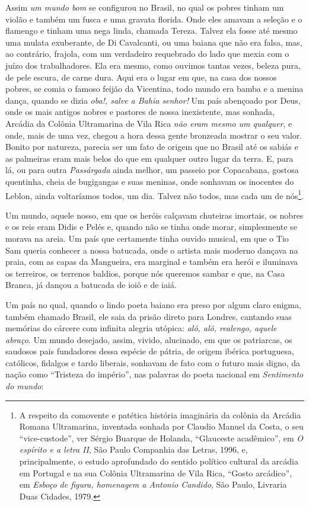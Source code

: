 Assim \emph{um mundo bom} se configurou no Brasil, no qual os pobres
tinham um violão e também um fusca e uma gravata florida. Onde eles
amavam a seleção e o flamengo e tinham uma nega linda, chamada Tereza.
Talvez ela fosse até mesmo uma mulata exuberante, de Di Cavalcanti, ou
uma baiana que não era falsa, mas, ao contrário, frajola, com um
verdadeiro requebrado do lado que mexia com o juízo dos trabalhadores.
Ela era mesmo, como ouvimos tantas vezes, beleza pura, de pele escura,
de carne dura. Aqui era o lugar em que, na casa dos nossos pobres, se
comia o famoso feijão da Vicentina, todo mundo era bamba e a menina
dança, quando se dizia \emph{oba!, salve a Bahia senhor!} Um país
abençoado por Deus, onde os mais antigos nobres e pastores de nossa
inexistente, mas sonhada, Arcádia da Colônia Ultramarina de Vila Rica
\emph{não eram mesmo um qualquer}, e onde, mais de uma vez, chegou a
hora dessa gente bronzeada mostrar o seu valor. Bonito por natureza,
parecia ser um fato de origem que no Brasil até os sabiás e as palmeiras
eram mais belos do que em qualquer outro lugar da terra. E, para lá, ou
para outra \emph{Passárgada} ainda melhor, um passeio por Copacabana,
gostosa quentinha, cheia de bugigangas e suas meninas, onde sonhavam os
inocentes do Leblon, ainda voltaríamos todos, um dia. Talvez não todos,
mas cada um de nós\footnote{A respeito da comovente e patética história
  imaginária da colônia da Arcádia Romana Ultramarina, inventada sonhada
  por Claudio Manuel da Costa, o seu ``vice-custode'', ver Sérgio
  Buarque de Holanda, ``Glauceste acadêmico'', em \emph{O espírito e a
  letra II}, São Paulo Companhia das Letras, 1996, e, principalmente, o
  estudo aprofundado do sentido político cultural da arcádia em Portugal
  e na sua Colônia Ultramarina de Vila Rica, ``Gosto arcádico'', em
  \emph{Esboço de figura, homenagem a Antonio Candido}, São Paulo,
  Livraria Duas Cidades, 1979.}.

Um mundo, aquele nosso, em que os heróis calçavam chuteiras imortais, os
nobres e os reis eram Didis e Pelés e, quando não se tinha onde morar,
simplesmente se morava na areia. Um país que certamente tinha ouvido
musical, em que o Tio Sam queria conhecer a nossa batucada, onde o
artista mais moderno dançava na praia, com as capas da Mangueira, era
marginal e também era herói e iluminava os terreiros, os terrenos
baldios, porque nós queremos sambar e que, na Casa Branca, já dançou a
batucada de ioiô e de iaiá.

Um país no qual, quando o lindo poeta baiano era preso por algum claro
enigma, também chamado Brasil, ele saia da prisão direto para Londres,
cantando suas memórias do cárcere com infinita alegria utópica:
\emph{alô, alô, realengo, aquele abraço}. Um mundo desejado, assim,
vivido, alucinado, em que os patriarcas, os saudosos pais fundadores
dessa espécie de pátria, de origem ibérica portuguesa, católicos,
fidalgos e tardo liberais, sonhavam de fato com o futuro mais digno, da
nação como ``Tristeza do império'', nas palavras do poeta nacional em
\emph{Sentimento do mundo}:

